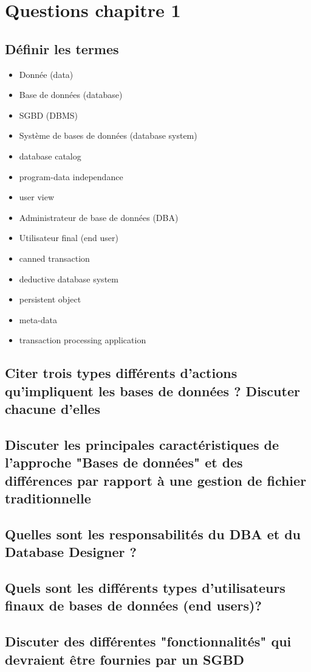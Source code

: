 \section{Questions chapitre 1}

\subsection{Définir les termes}

\begin{itemize}
	\item Donnée (data)
	\item Base de données (database)
	\item SGBD (DBMS)
	\item Système de bases de données (database system)
	\item database catalog
	\item program-data independance
	\item user view
	\item Administrateur de base de données (DBA)
	\item Utilisateur final (end user)
	\item canned transaction
	\item deductive database system
	\item persistent object
	\item meta-data
	\item transaction processing application
\end{itemize}

\subsection{Citer trois types différents d'actions qu'impliquent les bases de données ? Discuter chacune d'elles}


\subsection{Discuter les principales caractéristiques de l'approche "Bases de données" et des différences par rapport à une gestion de fichier traditionnelle}

\subsection{Quelles sont les responsabilités du DBA et du Database Designer ?}

\subsection{Quels sont les différents types d'utilisateurs finaux de bases de données (end users)?}

\subsection{Discuter des différentes "fonctionnalités" qui devraient être fournies par un SGBD}
